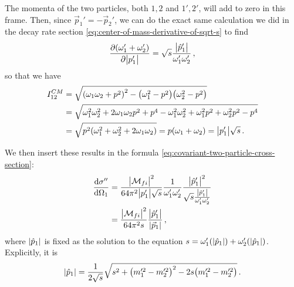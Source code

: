 \documentclass[main.tex]{subfiles}
\begin{document}
The momenta of the two particles, both \(1, 2\) and \(1', 2'\), will add to zero in this frame. 
Then, since \(\vec{p}_1' = -\vec{p}_2'\), we can do the exact same calculation we did in the decay rate section \eqref{eq:center-of-mass-derivative-of-sqrt-s} to find 
%
\begin{align}
\pdv{(\omega_1 ' + \omega_2 ')}{\abs{p_1'}}
= \sqrt{s} \frac{\abs{\hat{p}_1'}}{\omega_1 ' \omega_2 '}
\,,
\end{align}
%
so that we have 
%
\begin{align}
I^{CM}_{12} &= \sqrt{\qty(
\omega_1 \omega_2 + p^2
)^2
-
\qty(\omega_1^2 - p^2) 
\qty(\omega_2^2 - p^2) 
}  \\
&= \sqrt{
\omega_1^2 \omega_2^2 + 2 \omega_1 \omega_2 p^2 + p^{4} - \omega_1^2 \omega_2^2+ \omega_1^2 p^2 + \omega_2^2p^2 - p^{4}
}  \\
&= \sqrt{p^2(\omega_1^2 + \omega_2^2+ 2 \omega_1 \omega_2 )} 
= p (\omega_1 +\omega_2 ) = \abs{p'_1} \sqrt{s}
\,.
\end{align}

We then insert these results in the formula \eqref{eq:covariant-two-particle-cross-section}: 
%
\begin{align}
\dv{\sigma ''}{\Omega_1 } &= \frac{\abs{\mathcal{M}_{fi}}^2}{64 \pi^2 \abs{p'_1} \sqrt{s} } \frac{1}{\omega_1' \omega_2 '} 
\frac{\abs{\hat{p}_1'}^2}{ \sqrt{s} \frac{\abs{\hat{p}_1'}}{\omega_1 ' \omega_2 '}}  \\
&= \frac{\abs{\mathcal{M}_{fi}}^2}{64 \pi^2 s }
\frac{\abs{\hat{p}_1'}}{\abs{\vec{p}_1}}
\,,
\end{align}
%
where \(\abs{\hat{p}_1}\) is fixed as the solution to the equation \(s = \omega_1 ' (\abs{\hat{p}_1}) + \omega_2 '(\abs{\hat{p}_1})\). Explicitly, it is 
%
\begin{align}
\abs{\hat{p}_1} =
\frac{1}{2 \sqrt{s}}
\sqrt{
s^2 + \qty(m^{\prime 2}_1 - m^{\prime 2}_2)^2
- 2s \qty(m^{\prime 2}_1- m^{\prime 2}_2)
}
\,.
\end{align}
\end{document}
